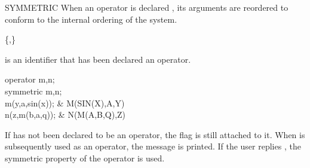 \begin{Declaration}{SYMMETRIC}
When an operator is declared , its arguments are reordered
to conform to the internal ordering of the system.  
\begin{Syntax}
 \{,\}\optional
\end{Syntax}

 is an identifier that has been declared an operator.

\begin{Examples}
operator m,n; \\
symmetric m,n; \\
m(y,a,sin(x));               &           M(SIN(X),A,Y) \\
n(z,m(b,a,q));               &           N(M(A,B,Q),Z)
\end{Examples}

\begin{Comments}
If  has not been declared to be an operator, the flag
 is still attached to it.  When  is
subsequently used as an operator, the message 
  is printed.  If the user replies , the
symmetric property of the operator is used.
\end{Comments}
\end{Declaration}


